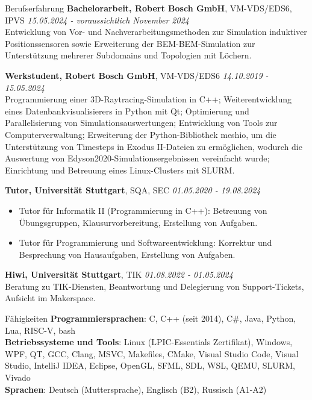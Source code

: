 \documentclass{resume} %
\begin{document}
\begin{rSection}{Berufserfahrung}
{\bf Bachelorarbeit, Robert Bosch GmbH}{, VM-VDS/EDS6, IPVS} \hfill {\em 15.05.2024 - voraussichtlich November 2024}\\
Entwicklung von Vor- und Nachverarbeitungsmethoden zur Simulation induktiver Positionssensoren sowie Erweiterung der BEM-BEM-Simulation zur Unterstützung mehrerer Subdomains und Topologien mit Löchern.

{\bf Werkstudent, Robert Bosch GmbH}{, VM-VDS/EDS6} \hfill {\em 14.10.2019 - 15.05.2024}\\
Programmierung einer 3D-Raytracing-Simulation in C++; Weiterentwicklung eines Datenbankvisualisierers in Python mit Qt; Optimierung und Parallelisierung von Simulationsauswertungen; Entwicklung von Tools zur Computerverwaltung; Erweiterung der Python-Bibliothek meshio, um die Unterstützung von Timesteps in Exodus II-Dateien zu ermöglichen, wodurch die Auswertung von Edyson2020-Simulationsergebnissen vereinfacht wurde; Einrichtung und Betreuung eines Linux-Clusters mit SLURM.

{\bf Tutor, Universität Stuttgart}{, SQA, SEC} \hfill {\em 01.05.2020 - 19.08.2024}
\begin{itemize}
    \item Tutor für Informatik II (Programmierung in C++): Betreuung von Übungsgruppen, Klausurvorbereitung, Erstellung von Aufgaben.
    \item Tutor für Programmierung und Softwareentwicklung: Korrektur und Besprechung von Hausaufgaben, Erstellung von Aufgaben.
\end{itemize}

{\bf Hiwi, Universität Stuttgart}{, TIK} \hfill {\em 01.08.2022 - 01.05.2024}\\
Beratung zu TIK-Diensten, Beantwortung und Delegierung von Support-Tickets, Aufsicht im Makerspace.
\end{rSection}


\begin{rSection}{Fähigkeiten}
{\bf Programmiersprachen}: C, C++ (seit 2014), C\#, Java, Python, Lua, RISC-V, bash \\
{\bf Betriebssysteme und Tools}: Linux (LPIC-Essentials Zertifikat), Windows, WPF, QT, GCC, Clang, MSVC, Makefiles, CMake, Visual Studio Code, Visual Studio, IntelliJ IDEA, Eclipse, OpenGL, SFML, SDL, WSL, QEMU, SLURM, Vivado \\
{\bf Sprachen}: Deutsch (Muttersprache), Englisch (B2), Russisch (A1-A2)
\end{rSection}
\end{document}
